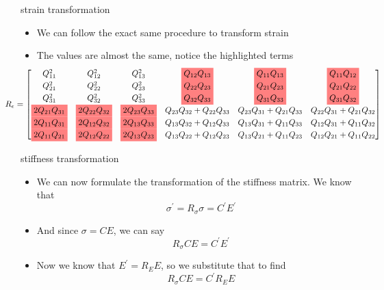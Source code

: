 \documentclass[
  letterpaper,
  ignorenonframetext,
  aspectratio=43,
  handout,
  12pt]{beamer}
\providecommand{\tightlist}{%
  \setlength{\itemsep}{0pt}\setlength{\parskip}{0pt}}
\providecommand{\tightlist}{%
\setlength{\itemsep}{0pt}\setlength{\parskip}{0pt}}
\begin{document}
\begin{frame}{strain transformation}
\protect\hypertarget{strain-transformation}{}
\begin{itemize}
\tightlist
\item
  We can follow the exact same procedure to transform strain
\item
  The values are almost the same, notice the highlighted terms
  \[\hspace{-.5in} \resizebox{1.2\hsize}{!}{$\displaystyle
			R_\epsilon = \begin{bmatrix}
    Q_{11}^2 & Q_{12}^2 & Q_{13}^2 & %
    \colorbox{red!50}{$\displaystyle Q_{12}Q_{13}$} &  %
    \colorbox{red!50}{$\displaystyle Q_{11} Q_{13}$} & %
    \colorbox{red!50}{$\displaystyle Q_{11}Q_{12}$}\\
    Q_{21}^2 & Q_{22}^2 & Q_{23}^2 & %
    \colorbox{red!50}{$\displaystyle Q_{22}Q_{23}$} &  %
    \colorbox{red!50}{$\displaystyle Q_{21} Q_{23}$} & %
    \colorbox{red!50}{$\displaystyle Q_{21}Q_{22}$}\\
    Q_{31}^2 & Q_{32}^2 & Q_{33}^2 & %
    \colorbox{red!50}{$\displaystyle Q_{32}Q_{33}$} &  %
    \colorbox{red!50}{$\displaystyle Q_{31} Q_{33}$} & %
    \colorbox{red!50}{$\displaystyle Q_{31}Q_{32}$}\\
    \colorbox{red!50}{$\displaystyle 2Q_{21}Q_{31}$} & %
    \colorbox{red!50}{$\displaystyle 2Q_{22}Q_{32}$} & %
    \colorbox{red!50}{$\displaystyle 2Q_{23}Q_{33}$} & Q_{23}Q_{32} + Q_{22}Q_{33} & Q_{23}Q_{31} + Q_{21}Q_{33} & Q_{22}Q_{31} + Q_{21}Q_{32}\\
    \colorbox{red!50}{$\displaystyle 2Q_{11}Q_{31}$} & %
    \colorbox{red!50}{$\displaystyle 2Q_{12}Q_{32}$} & %
    \colorbox{red!50}{$\displaystyle 2Q_{13}Q_{33}$} & Q_{13}Q_{32} + Q_{12}Q_{33} & Q_{13}Q_{31} + Q_{11}Q_{33} & Q_{12}Q_{31} + Q_{11}Q_{32}\\
    \colorbox{red!50}{$\displaystyle 2Q_{11}Q_{21}$} & %
    \colorbox{red!50}{$\displaystyle 2Q_{12}Q_{22}$} & %
    \colorbox{red!50}{$\displaystyle 2Q_{13}Q_{23}$} & Q_{13}Q_{22} + Q_{12}Q_{23} & Q_{13}Q_{21} + Q_{11}Q_{23} & Q_{12}Q_{21} + Q_{11}Q_{22}
  \end{bmatrix} 
$}
  \]
\end{itemize}
\end{frame}

\begin{frame}{stiffness transformation}
\protect\hypertarget{stiffness-transformation}{}
\begin{itemize}
\item
  We can now formulate the transformation of the stiffness matrix. We
  know that \[\sigma^\prime = R_\sigma \sigma = C^\prime E^\prime\]
\item
  And since \(\sigma = C E\), we can say
  \[R_\sigma C E = C^\prime E^\prime\]
\item
  Now we know that \(E^\prime = R_E E\), so we substitute that to find
  \[R_\sigma C E = C^\prime R_E E\]
\end{itemize}
\end{frame}
\end{document}
